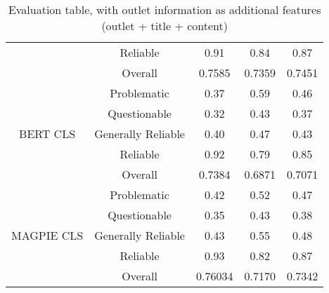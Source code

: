 \begin{table}[htbp]
\begin{tabular}{| c | c | c | c | c |}
                                                          & Reliable           & 0.91               & 0.84            & 0.87            \\\cline{2-5}
                                                          & Overall            & 0.7585             & 0.7359          & 0.7451          \\
        \hline
        \multirow{5}{*}{BERT CLS}                         & Problematic        & 0.37               & 0.59            & 0.46            \\
                                                          & Questionable       & 0.32               & 0.43            & 0.37            \\
                                                          & Generally Reliable & 0.40               & 0.47            & 0.43            \\
                                                          & Reliable           & 0.92               & 0.79            & 0.85            \\\cline{2-5}
                                                          & Overall            & 0.7384             & 0.6871          & 0.7071          \\
        \hline
        \multirow{5}{*}{MAGPIE CLS}                       & Problematic        & 0.42               & 0.52            & 0.47            \\
                                                          & Questionable       & 0.35               & 0.43            & 0.38            \\
                                                          & Generally Reliable & 0.43               & 0.55            & 0.48            \\
                                                          & Reliable           & 0.93               & 0.82            & 0.87            \\\cline{2-5}
                                                          & Overall            & 0.76034            & 0.7170          & 0.7342          \\
        \hline
    \end{tabular}
    \caption{Evaluation table, with outlet information as additional features (outlet + title + content)}
    \label{table:eval-outlet}
\end{table}


